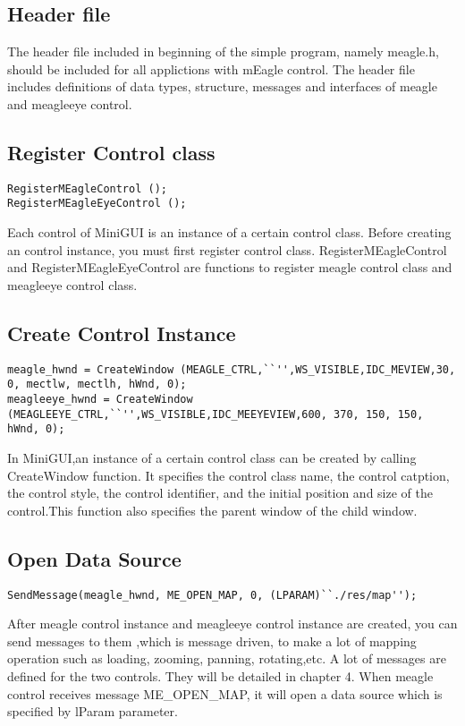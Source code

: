 \documentclass[a4paper]{article}
\begin{document}
\subsection{Header file}
The header file included in beginning of the simple program, namely meagle.h, should be included for all applictions with mEagle control. The header file includes definitions of data types, structure, messages and interfaces of meagle and meagleeye control.

\subsection{Register Control class}
\begin{lstlisting}
RegisterMEagleControl ();
RegisterMEagleEyeControl ();
\end{lstlisting}
Each control of MiniGUI is an instance of a certain control class. Before creating an control instance, you must first register control class. RegisterMEagleControl and RegisterMEagleEyeControl are functions to register meagle control class and meagleeye control class.

\subsection{Create Control Instance}
\begin{lstlisting}
meagle_hwnd = CreateWindow (MEAGLE_CTRL,``'',WS_VISIBLE,IDC_MEVIEW,30, 0, mectlw, mectlh, hWnd, 0); 
meagleeye_hwnd = CreateWindow (MEAGLEEYE_CTRL,``'',WS_VISIBLE,IDC_MEEYEVIEW,600, 370, 150, 150, hWnd, 0);
\end{lstlisting}
In MiniGUI,an instance of a certain control class can be created by calling CreateWindow function. It specifies the control class name, the control catption, the control style, the control identifier, and the initial position and size of the control.This function also specifies the parent window of the child window. 

\subsection{Open Data Source}
\begin{lstlisting}
SendMessage(meagle_hwnd, ME_OPEN_MAP, 0, (LPARAM)``./res/map'');
\end{lstlisting}
After meagle control instance and meagleeye control instance are created, you can send messages to them ,which is message driven, to make a lot of mapping operation such as loading, zooming, panning, rotating,etc. A lot of messages are defined for the two controls. They will be detailed in chapter 4.  When meagle control receives message ME\_OPEN\_MAP, it will open a data source which is specified by lParam parameter.  
\end{document}
